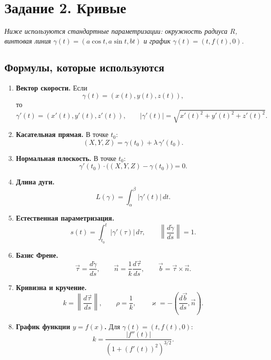 \documentclass[12pt,a4paper]{article}
\begin{document}
\section*{Задание 2. Кривые}

\textit{Ниже используются стандартные параметризации: окружность радиуса $R$, винтовая линия $\gamma(t) = (a\cos t, a\sin t, bt)$ и график $\gamma(t) = (t, f(t), 0)$.}

\subsection*{Формулы, которые используются}

\begin{enumerate}
    \item \textbf{Вектор скорости.} Если
    \[
    \gamma(t) = (x(t), y(t), z(t)),
    \]
    то
    \[
    \gamma'(t) = (x'(t), y'(t), z'(t)), \qquad |\gamma'(t)| = \sqrt{x'(t)^2 + y'(t)^2 + z'(t)^2}.
    \]

    \item \textbf{Касательная прямая.} В точке $t_0$:
    \[
    (X,Y,Z) = \gamma(t_0) + \lambda\,\gamma'(t_0).
    \]

    \item \textbf{Нормальная плоскость.} В точке $t_0$:
    \[
    \gamma'(t_0)\cdot\bigl((X,Y,Z)-\gamma(t_0)\bigr)=0.
    \]

    \item \textbf{Длина дуги.}
    \[
    L(\gamma) = \int_{\alpha}^{\beta} |\gamma'(t)|\,dt.
    \]

    \item \textbf{Естественная параметризация.}
    \[
    s(t) = \int_{t_0}^{t} |\gamma'(\tau)|\,d\tau, \qquad \left\| \frac{d\tilde{\gamma}}{ds} \right\| = 1.
    \]

    \item \textbf{Базис Френе.}
    \[
    \vec{\tau} = \frac{d\tilde{\gamma}}{ds}, \qquad
    \vec{n} = \frac{1}{k}\frac{d\vec{\tau}}{ds}, \qquad
    \vec{b} = \vec{\tau} \times \vec{n}.
    \]

    \item \textbf{Кривизна и кручение.}
    \[
    k = \left\| \frac{d\vec{\tau}}{ds} \right\|, \qquad
    \rho = \frac{1}{k}, \qquad
    \varkappa = -\left( \frac{d\vec{b}}{ds}, \vec{n} \right).
    \]

    \item \textbf{График функции $y=f(x)$.}
    Для $\gamma(t) = (t, f(t), 0)$:
    \[
    k = \frac{|f''(t)|}{(1+(f'(t))^2)^{3/2}}.
    \]
\end{enumerate}
\end{document}
